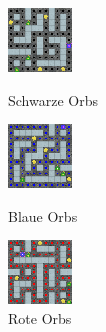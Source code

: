 \begin{figure}[htb!]

   \captionsetup{width=0.30\linewidth} 
    \begin{minipage}{0.3\linewidth}
        \centering
        \includegraphics[scale=1.2]{abb/_envpics/example_black}
        \caption*{Schwarze Orbs}
        \label{fig:pic_chaser_blackOrb}
    \end{minipage}
    \begin{minipage}{0.3\linewidth}
        \centering
        \includegraphics[scale=1.2]{abb/_envpics/example_blue}
        \caption*{Blaue Orbs}
        \label{fig:pic_chaser_blueOrb}
    \end{minipage}
    \begin{minipage}{0.3\linewidth}
        \centering
        \includegraphics[scale=1.2]{abb/_envpics/example_red}
        \caption*{Rote Orbs}
        \label{fig:pic_chaser_redOrb}
    \end{minipage}
\end{figure}

